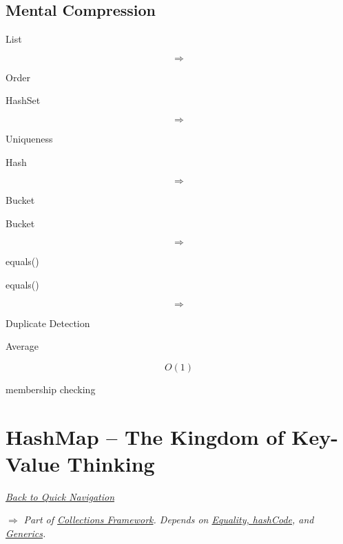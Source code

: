 \documentclass[11pt,a4paper]{book}
\begin{document}

\section{Mental Compression}

List

\[
\Rightarrow
\]

Order


HashSet

\[
\Rightarrow
\]

Uniqueness


Hash

\[
\Rightarrow
\]

Bucket


Bucket

\[
\Rightarrow
\]

equals()


equals()

\[
\Rightarrow
\]

Duplicate Detection


Average

\[
O(1)
\]

membership checking

\chapter{HashMap -- The Kingdom of Key-Value Thinking}

\smallskip
\noindent
\hyperref[sec:quick_nav]{\emph{Back to Quick Navigation}}

\smallskip
\noindent
\textcolor{RosettaRoyalPurple}{$\Rightarrow$}
\emph{Part of \hyperref[chap:collections]{Collections Framework}. Depends on \hyperref[chap:objects_identity]{Equality, hashCode}, and \hyperref[chap:generics]{Generics}.}

\end{document}
